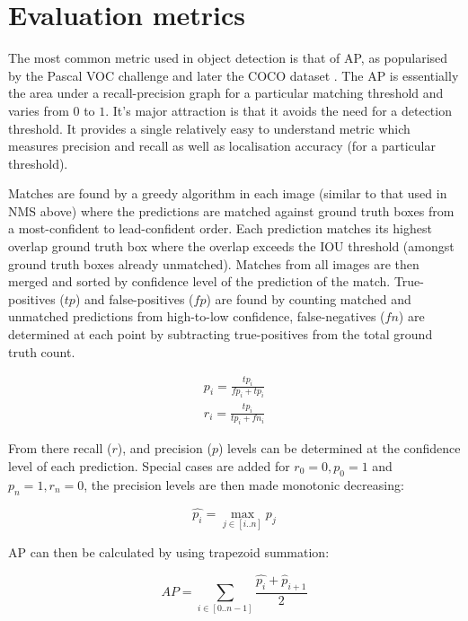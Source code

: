 \section{Evaluation metrics}
\label{sec:evaluation_metrics}

The most common metric used in object detection is that of \gls{AP}, as popularised by the Pascal VOC challenge \cite{Everingham2008} and later the COCO dataset \cite{Lin2014}. The \gls{AP} is essentially the area under a recall-precision graph for a particular matching threshold and varies from $0$  to $1$. It's major attraction is that it avoids the need for a detection threshold. It provides a single relatively easy to understand metric which measures precision and recall as well as localisation accuracy (for a particular threshold).

Matches are found by a greedy algorithm in each image (similar to that used in \gls{NMS} above) where the predictions are matched against ground truth boxes from a most-confident to lead-confident order. Each prediction matches its highest overlap ground truth box where the overlap exceeds the \gls{IOU} threshold (amongst ground truth boxes already unmatched). Matches from all images are then merged and sorted by confidence level of the prediction of the match. True-positives ($tp$) and false-positives ($fp$) are found by counting matched and unmatched predictions from high-to-low confidence, false-negatives ($fn$) are determined at each point by subtracting true-positives from the total ground truth count. 

\begin{equation*}
\begin{split}
p_i = \frac{tp_i}{fp_i + tp_i}\\
r_i = \frac{tp_i}{tp_i + fn_i}
\end{split}
\end{equation*}

From there recall ($r$), and precision ($p$) levels can be determined at the confidence level of each prediction. Special cases are added for $r_0=0, p_0=1$ and $p_n=1, r_n=0$, the precision levels are then made monotonic decreasing:

\begin{equation}
\hat{p_i} = \max_{j \in [i..n]}{p_j}
\end{equation}

\gls{AP} can then be calculated by using trapezoid summation:

\begin{equation}
AP = \sum_{i \in [0..n-1]}\frac{\hat{p_i} + \hat{p}_{i + 1}}{2}
\end{equation}


